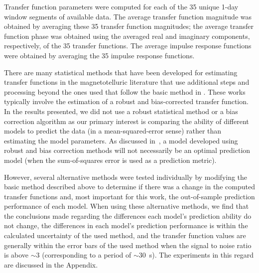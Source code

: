 \documentclass[draft,linenumbers]{agujournal2018}
\begin{document}


Transfer function parameters were computed for each of the 35 unique 1-day window segments of available data. The average transfer function magnitude was obtained by averaging these 35 transfer function magnitudes; the average transfer function phase was obtained using the averaged real and imaginary components, respectively, of the 35 transfer functions. The average impulse response functions were obtained by averaging the 35 impulse response functions. 

There are many statistical methods that have been developed for estimating transfer functions in the magnetotelluric literature that use additional steps and processing \citep{Egbert1986,Chave1987,Chave1989,Jones1989,Larsen1996,Egbert1997,Eisel2001,Chave2004,Chave2012,Chave2017} beyond the ones used that follow the basic method in \cite{Simpson2005}. These works typically involve the estimation of a robust and bias-corrected transfer function. In the results presented, we did not use a robust statistical method or a bias correction algorithm as our primary interest is comparing the ability of different models to predict the data (in a mean-squared-error sense) rather than estimating the model parameters. As discussed in~\cite{Weigel2017}, a model developed using robust and bias correction methods will not necessarily be an optimal prediction model (when the sum-of-squares error is used as a prediction metric).

However, several alternative methods were tested individually by modifying the basic method described above to determine if there was a change in the computed transfer functions and, most important for this work, the out-of-sample prediction performance of each model. When using these alternative methods, we find that the conclusions made regarding the differences each model's prediction ability do not change, the differences in each model's prediction performance is within the calculated uncertainty of the used method, and the transfer function values are generally within the error bars of the used method when the signal to noise ratio is above $\sim$3 (corresponding to a period of $\sim 30$~s). The experiments in this regard are discussed in the Appendix.
\end{document}
